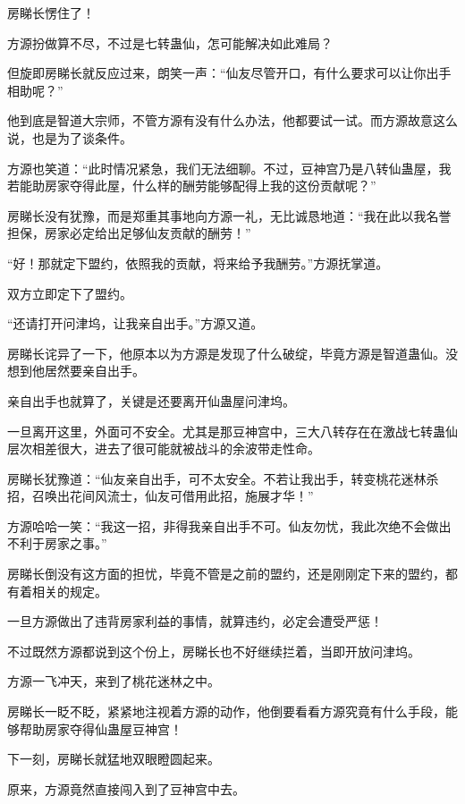 
\begin{this_body}



房睇长愣住了！

方源扮做算不尽，不过是七转蛊仙，怎可能解决如此难局？

但旋即房睇长就反应过来，朗笑一声：“仙友尽管开口，有什么要求可以让你出手相助呢？”

他到底是智道大宗师，不管方源有没有什么办法，他都要试一试。而方源故意这么说，也是为了谈条件。

方源也笑道：“此时情况紧急，我们无法细聊。不过，豆神宫乃是八转仙蛊屋，我若能助房家夺得此屋，什么样的酬劳能够配得上我的这份贡献呢？”

房睇长没有犹豫，而是郑重其事地向方源一礼，无比诚恳地道：“我在此以我名誉担保，房家必定给出足够仙友贡献的酬劳！”

“好！那就定下盟约，依照我的贡献，将来给予我酬劳。”方源抚掌道。

双方立即定下了盟约。

“还请打开问津坞，让我亲自出手。”方源又道。

房睇长诧异了一下，他原本以为方源是发现了什么破绽，毕竟方源是智道蛊仙。没想到他居然要亲自出手。

亲自出手也就算了，关键是还要离开仙蛊屋问津坞。

一旦离开这里，外面可不安全。尤其是那豆神宫中，三大八转存在在激战七转蛊仙层次相差很大，进去了很可能就被战斗的余波带走性命。

房睇长犹豫道：“仙友亲自出手，可不太安全。不若让我出手，转变桃花迷林杀招，召唤出花间风流士，仙友可借用此招，施展才华！”

方源哈哈一笑：“我这一招，非得我亲自出手不可。仙友勿忧，我此次绝不会做出不利于房家之事。”

房睇长倒没有这方面的担忧，毕竟不管是之前的盟约，还是刚刚定下来的盟约，都有着相关的规定。

一旦方源做出了违背房家利益的事情，就算违约，必定会遭受严惩！

不过既然方源都说到这个份上，房睇长也不好继续拦着，当即开放问津坞。

方源一飞冲天，来到了桃花迷林之中。

房睇长一眨不眨，紧紧地注视着方源的动作，他倒要看看方源究竟有什么手段，能够帮助房家夺得仙蛊屋豆神宫！

下一刻，房睇长就猛地双眼瞪圆起来。

原来，方源竟然直接闯入到了豆神宫中去。


\end{this_body}
